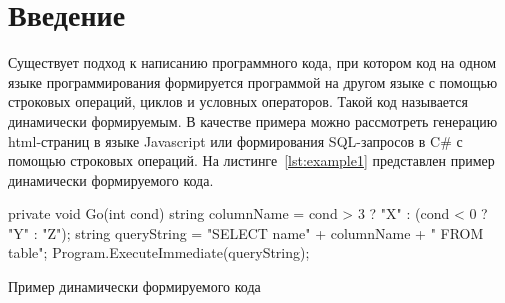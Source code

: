 \documentclass[14pt]{matmex-diploma}
\begin{document}





\maketitle
\tableofcontents
\section*{Введение}
Существует подход к написанию программного кода, при котором код на одном языке программирования формируется программой на другом языке с помощью строковых операций, циклов и условных операторов. Такой код называется динамически формируемым. В качестве примера можно рассмотреть генерацию html-страниц в языке Javascript или формирования SQL-запросов в C\# с помощью строковых операций. На листинге~\ref{lst:example1} представлен пример динамически формируемого кода.

\begin{listing}[H]
    \begin{pyglist}[language=csharp,numbers=left,numbersep=5pt]
 private void Go(int cond){
   string columnName = cond > 3 ? "X" : (cond < 0 ? "Y" : "Z");
   string queryString = 
       "SELECT name" + columnName + " FROM table";
   Program.ExecuteImmediate(queryString);}
    \end{pyglist}
\caption{Пример динамически формируемого кода}
\label{lst:example1}
\end{listing}
\end{document}
